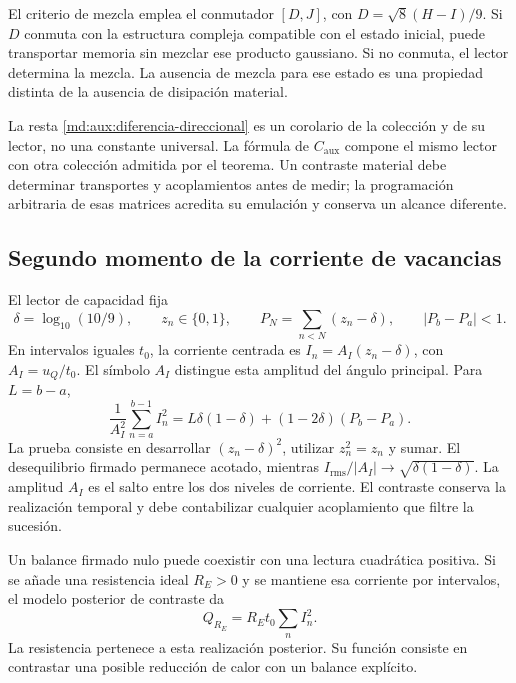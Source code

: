 El criterio de mezcla emplea el conmutador $[D,J]$, con
$D=\sqrt8(H-I)/9$. Si $D$ conmuta con la estructura compleja
compatible con el estado inicial, puede transportar memoria
sin mezclar ese producto gaussiano. Si no conmuta, el lector
determina la mezcla. La ausencia de mezcla para ese estado
es una propiedad distinta de la ausencia de disipación material.

La resta \eqref{md:aux:diferencia-direccional} es un corolario
de la colección y de su lector, no una constante universal.
La fórmula de $C_{\mathrm{aux}}$ compone el mismo lector con
otra colección admitida por el teorema. Un contraste material
debe determinar transportes y acoplamientos antes de medir;
la programación arbitraria de esas matrices acredita su
emulación y conserva un alcance diferente.

\subsection{Segundo momento de la corriente de vacancias}
\label{md:aux:vacancias}

El lector de capacidad fija
\[
 \delta=\log_{10}(10/9),\qquad z_n\in\{0,1\},\qquad
 P_N=\sum_{n<N}(z_n-\delta),\qquad |P_b-P_a|<1.
\]
En intervalos iguales $t_0$, la corriente centrada es
$I_n=A_I(z_n-\delta)$, con $A_I=u_Q/t_0$.
El símbolo $A_I$ distingue esta amplitud del ángulo principal.
Para $L=b-a$,
\begin{equation}
 \frac1{A_I^2}\sum_{n=a}^{b-1}I_n^2
 =L\delta(1-\delta)+(1-2\delta)(P_b-P_a).
 \label{md:aux:segundo-momento}
\end{equation}
La prueba consiste en desarrollar $(z_n-\delta)^2$, utilizar
$z_n^2=z_n$ y sumar. El desequilibrio firmado permanece
acotado, mientras
$I_{\mathrm{rms}}/|A_I|\longrightarrow\sqrt{\delta(1-\delta)}$.
La amplitud $A_I$ es el salto entre los dos niveles de corriente.
El contraste conserva la realización temporal y debe contabilizar
cualquier acoplamiento que filtre la sucesión.

Un balance firmado nulo puede coexistir con una lectura
cuadrática positiva. Si se añade una resistencia ideal $R_E>0$
y se mantiene esa corriente por intervalos, el modelo posterior
de contraste da
\begin{equation}
 Q_{R_E}=R_Et_0\sum_n I_n^2.
 \label{md:aux:contraste-resistivo}
\end{equation}
La resistencia pertenece a esta realización posterior. Su
función consiste en contrastar una posible reducción de calor
con un balance explícito.

